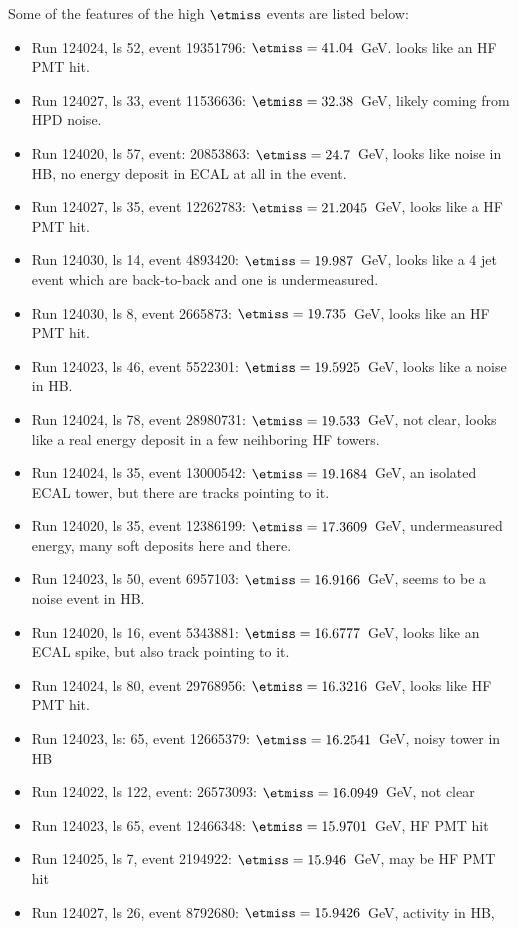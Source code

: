 Some of the features of the high $\etmiss$ events are listed below:
\begin{itemize}
\item Run 124024, ls 52, event 19351796: $\etmiss=41.04$~GeV. looks
like an HF PMT hit.
\item Run 124027, ls 33, event 11536636: $\etmiss=32.38$~GeV, likely coming from HPD noise.
\item Run 124020, ls 57, event: 20853863: $\etmiss=24.7$~GeV, looks like
noise in HB, no energy deposit in ECAL at all in the event.
\item Run 124027, ls 35, event 12262783: $\etmiss=21.2045$~GeV, looks like a
HF PMT hit.
\item Run 124030, ls 14, event 4893420: $\etmiss=19.987$~GeV, looks like a 4
jet event which are back-to-back and one is undermeasured.
\item Run 124030, ls 8, event 2665873:  $\etmiss=19.735$~GeV, looks like an HF
PMT hit.
\item Run 124023, ls 46, event 5522301: $\etmiss=19.5925$~GeV, looks like a noise in HB.
\item Run 124024, ls 78, event 28980731: $\etmiss=19.533$~GeV, not clear,
looks like a real energy deposit in a few neihboring HF towers.
\item Run 124024, ls 35, event 13000542: $\etmiss=19.1684$~GeV, an isolated
ECAL tower, but there are tracks pointing to it.
\item Run 124020, ls 35, event 12386199: $\etmiss=17.3609$~GeV,
  undermeasured energy, many soft deposits here and there.
\item Run 124023, ls 50, event 6957103: $\etmiss=16.9166$~GeV, seems to be a
noise event in HB.
\item Run 124020, ls 16, event 5343881: $\etmiss=16.6777$~GeV, looks like an
ECAL spike, but also track pointing to it.
\item Run 124024, ls 80, event 29768956: $\etmiss=16.3216$~GeV, looks like HF
PMT hit.
\item Run 124023, ls: 65, event 12665379: $\etmiss=16.2541$~GeV, noisy tower
in HB
\item Run 124022, ls 122, event: 26573093: $\etmiss=16.0949$~GeV, not clear
\item Run 124023, ls 65, event 12466348: $\etmiss=15.9701$~GeV, HF PMT hit
\item Run 124025, ls 7, event 2194922: $\etmiss=15.946$~GeV, may be HF PMT hit
\item Run 124027, ls 26, event 8792680: $\etmiss=15.9426$~GeV, activity in HB,

\end{itemize}
